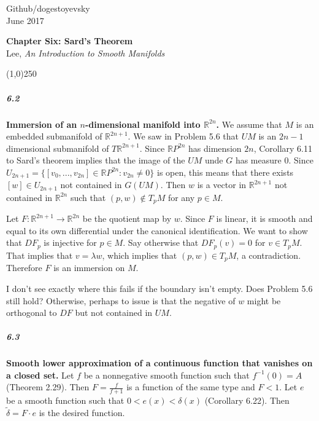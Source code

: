 \documentclass[10pt,letter]{article}
\begin{document}
\noindent Github/dogestoyevsky \\
June 2017
\begin{center}
\textbf{Chapter Six: Sard's Theorem}\\ Lee, \textit{An Introduction to Smooth Manifolds}

\line(1,0){250}
\end{center}

\subparagraph{6.2} {\bf Immersion of an $n$-dimensional manifold into $\mathbb{R}^{2n}$.} We assume that $M$ is an embedded submanifold of $\mathbb{R}^{2n+1}$. We saw in Problem 5.6 that $UM$ is an $2n-1$ dimensional submanifold of $T\mathbb{R}^{2n+1}$. Since $\mathbb{R}P^{2n}$ has dimension $2n$, Corollary 6.11 to Sard's theorem implies that the image of the $UM$ unde $G$ has measure $0$. Since $U_{2n+1} = \lbrace [v_0,...,v_{2n}] \in \mathbb{R}P^{2n}: v_{2n} \neq 0 \rbrace$ is open, this means that there exists $[w] \in U_{2n+1}$ not contained in $G(UM)$. Then $w$ is a vector in $\mathbb{R}^{2n+1}$ not contained in $\mathbb{R}^{2n}$ such that $(p,w) \not \in T_pM$ for any $p \in M$. 

Let $F: \mathbb{R}^{2n+1} \rightarrow \mathbb{R}^{2n}$ be the quotient map by $w$. Since $F$ is linear, it is smooth and equal to its own differential under the canonical identification. We want to show that $DF_p$ is injective for $p \in M$. Say otherwise that $DF_p(v) = 0$ for $v \in T_pM$. That implies that $v =  \lambda w$, which implies that $(p,w) \in T_pM$, a contradiction. Therefore $F$ is an immersion on $M$. 

I don't see exactly where this fails if the boundary isn't empty. Does Problem 5.6 still hold? Otherwise, perhaps to issue is that the negative of $w$ might be orthogonal to $DF$ but not contained in $UM$. 

\subparagraph{6.3} {\bf Smooth lower approximation of a continuous function that vanishes on a closed set.} Let $f$ be a nonnegative smooth function such that $f^{-1}(0) = A$ (Theorem 2.29). Then $F = \frac{f}{f+1}$ is a function of the same type and $F < 1$. Let $e$ be a smooth function such that $0 < e(x) < \delta(x)$ (Corollary 6.22). Then $\tilde{\delta} = F \cdot e$ is the desired function. 
\end{document}
